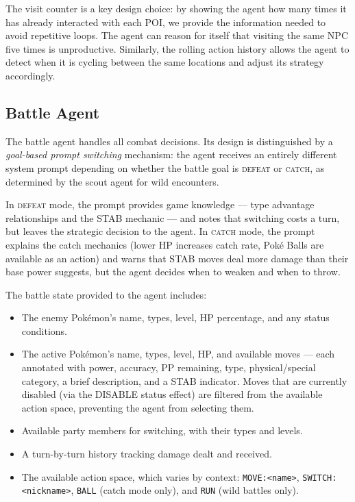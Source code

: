 \documentclass{article}
\begin{document}
The visit counter is a key design choice: by showing the agent how many times it has already interacted with each POI, we provide the information needed to avoid repetitive loops. The agent can reason for itself that visiting the same NPC five times is unproductive. Similarly, the rolling action history allows the agent to detect when it is cycling between the same locations and adjust its strategy accordingly.

\subsection{Battle Agent}

The battle agent handles all combat decisions. Its design is distinguished by a \emph{goal-based prompt switching} mechanism: the agent receives an entirely different system prompt depending on whether the battle goal is \textsc{defeat} or \textsc{catch}, as determined by the scout agent for wild encounters.

In \textsc{defeat} mode, the prompt provides game knowledge --- type advantage relationships and the STAB mechanic --- and notes that switching costs a turn, but leaves the strategic decision to the agent. In \textsc{catch} mode, the prompt explains the catch mechanics (lower HP increases catch rate, Pok\'{e} Balls are available as an action) and warns that STAB moves deal more damage than their base power suggests, but the agent decides when to weaken and when to throw.

The battle state provided to the agent includes:

\begin{itemize}
  \item The enemy Pok\'{e}mon's name, types, level, HP percentage, and any status conditions.
  \item The active Pok\'{e}mon's name, types, level, HP, and available moves --- each annotated with power, accuracy, PP remaining, type, physical/special category, a brief description, and a STAB indicator. Moves that are currently disabled (via the DISABLE status effect) are filtered from the available action space, preventing the agent from selecting them.
  \item Available party members for switching, with their types and levels.
  \item A turn-by-turn history tracking damage dealt and received.
  \item The available action space, which varies by context: \texttt{MOVE:<name>}, \texttt{SWITCH:<nickname>}, \texttt{BALL} (catch mode only), and \texttt{RUN} (wild battles only).
\end{itemize}
\end{document}
